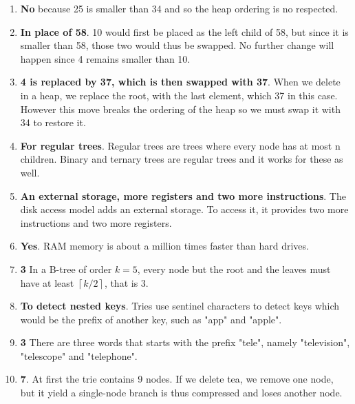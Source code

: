 \documentclass[11pt]{article}
\begin{document}
\begin{enumerate}
\item \textbf{No} because 25 is smaller than 34 and so the heap ordering is no
respected.

\item \textbf{In place of 58}. 10 would first be placed as the left child of
58, but since it is smaller than 58, those two would thus be
swapped. No further change will happen since 4 remains smaller
than 10.

\item \textbf{4 is replaced by 37, which is then swapped with 37}. When we
delete in a heap, we replace the root, with the last element,
which 37 in this case. However this move breaks the ordering of
the heap so we must swap it with 34 to restore it.

\item \textbf{For regular trees}. Regular trees are trees where every node has
at most n children. Binary and ternary trees are regular trees
and it works for these as well.

\item \textbf{An external storage, more registers and two more
instructions}. The disk access model adds an external storage. To
access it, it provides two more instructions and two more
registers.

\item \textbf{Yes}. RAM memory is about a million times faster than hard
drives.

\item \textbf{3} In a B-tree of order \(k=5\), every node but the root and the
leaves must have at least \(\left \lceil k/2 \right \rceil\), that
is 3.

\item \textbf{To detect nested keys}. Tries use sentinel characters to detect
keys which would be the prefix of another key, such as "app" and
"apple".

\item \textbf{3} There are three words that starts with the prefix "tele",
namely "television", "telescope" and "telephone".

\item \textbf{7}. At first the trie contains 9 nodes. If we delete tea, we
remove one node, but it yield a single-node branch is thus
compressed and loses another node.
\end{enumerate}
\end{document}
